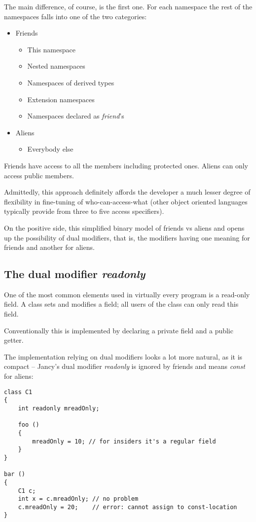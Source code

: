 \documentclass[oneside]{book}
\begin{document}
The main difference, of course, is the first one. For each namespace the rest of the namespaces falls into one of the two categories:
\begin{itemize}
\item Friends
	\begin{itemize}
	\item This namespace
	\item Nested namespaces
	\item Namespaces of derived types
	\item Extension namespaces
	\item Namespaces declared as \emph{friend}'s
	\end{itemize}
\item Aliens
	\begin{itemize}
	\item Everybody else
	\end{itemize}
\end{itemize}

Friends have access to all the members including protected ones. Aliens can only access public members.

Admittedly, this approach definitely affords the developer a much lesser degree of flexibility in fine-tuning of who-can-access-what (other object oriented languages typically provide from three to five access specifiers).

On the positive side, this simplified binary model of friends vs aliens and opens up the possibility of dual modifiers, that is, the modifiers having one meaning for friends and another for aliens.

\subsection{The dual modifier \emph{readonly}}
One of the most common elements used in virtually every program is a read-only field. A class sets and modifies a field; all users of the class can only read this field.

Conventionally this is implemented by declaring a private field and a public getter.

The implementation relying on dual modifiers looks a lot more natural, as it is compact -- Jancy's dual modifier \emph{readonly} is ignored by friends and means \emph{const} for aliens:

\begin{lstlisting}
class C1
{
    int readonly mreadOnly;

    foo ()
    {
        mreadOnly = 10; // for insiders it's a regular field
    }
}

bar ()
{
    C1 c;
    int x = c.mreadOnly; // no problem
    c.mreadOnly = 20;    // error: cannot assign to const-location
}
\end{lstlisting}
\end{document}
